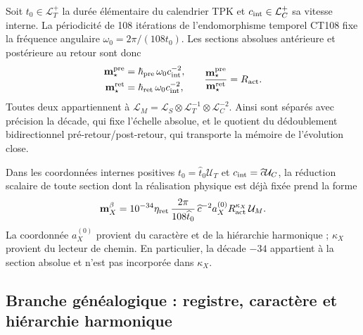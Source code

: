 Soit \(t_0\in\mathcal L_T^+\) la durée élémentaire du calendrier TPK et
\(c_{\rm int}\in\mathcal L_C^+\) sa vitesse interne. La périodicité de
108 itérations de l'endomorphisme temporel CT108 fixe la fréquence angulaire
\(\omega_0=2\pi/(108t_0)\). Les sections absolues antérieure et postérieure au
retour sont donc
\begin{equation}
 \begin{aligned}
 \mathbf m_\star^{\rm pre}
 &=\boldsymbol\hbar_{\rm pre}\,\omega_0c_{\rm int}^{-2},\\
 \mathbf m_\star^{\rm ret}
 &=\boldsymbol\hbar_{\rm ret}\,\omega_0c_{\rm int}^{-2},
 \end{aligned}
 \qquad
 \frac{\mathbf m_\star^{\rm pre}}
      {\mathbf m_\star^{\rm ret}}=R_{\rm act}.
 \label{eq:secciones-absolutas-masa-autonoma}
\end{equation}
Toutes deux appartiennent à
\(
 \mathcal L_M=\mathcal L_S\otimes\mathcal L_T^{-1}
 \otimes\mathcal L_C^{-2}
\).
Ainsi sont séparés avec précision la décade, qui fixe l'échelle absolue, et le
quotient du dédoublement bidirectionnel pré-retour/post-retour, qui
transporte la mémoire de l'évolution close.

Dans les coordonnées internes positives
\(t_0=\widehat t_0\mathcal U_T\) et
\(c_{\rm int}=\widehat c\mathcal U_C\), la réduction scalaire de toute
section dont la réalisation physique est déjà fixée prend la forme
\begin{equation}
 \mathbf m_X^\beta
 =10^{-34}\eta_{\rm ret}\,
  \frac{2\pi}{108\widehat t_0}\,\widehat c^{-2}
  a_X^{(0)}R_{\rm act}^{\kappa_X}\,\mathcal U_M .
 \label{eq:ley-escalar-general-masas-autonoma}
\end{equation}
La coordonnée \(a_X^{(0)}\) provient du caractère et de la hiérarchie harmonique ;
\(\kappa_X\) provient du lecteur de chemin. En particulier, la décade
\(-34\) appartient à la section absolue et n'est pas incorporée dans
\(\kappa_X\).

\subsection{Branche généalogique : registre, caractère et hiérarchie harmonique}

